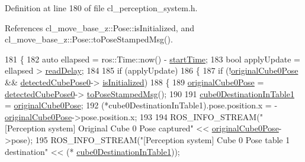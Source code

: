 Definition at line 180 of file cl\+\_\+perception\+\_\+system.\+h.



References cl\+\_\+move\+\_\+base\+\_\+z\+::\+Pose\+::is\+Initialized, and cl\+\_\+move\+\_\+base\+\_\+z\+::\+Pose\+::to\+Pose\+Stamped\+Msg().


\begin{DoxyCode}
181   \{
182     \textcolor{keyword}{auto} ellapsed = ros::Time::now() - \hyperlink{classsm__moveit__3_1_1cl__perception__system_1_1ClPerceptionSystem_adbc00ec0624260b9a927cf927fb1f549}{startTime};
183     \textcolor{keywordtype}{bool} applyUpdate = ellapsed > \hyperlink{classsm__moveit__3_1_1cl__perception__system_1_1ClPerceptionSystem_ad8826a690d57933b8adbe9011679f600}{readDelay};
184 
185     \textcolor{keywordflow}{if} (applyUpdate)
186     \{
187       \textcolor{keywordflow}{if} (!\hyperlink{classsm__moveit__3_1_1cl__perception__system_1_1ClPerceptionSystem_a296e8dd41bbb35a95d64e1780ab8be3d}{originalCube0Pose} && \hyperlink{classsm__moveit__3_1_1cl__perception__system_1_1ClPerceptionSystem_a6ac235df679beb12a5b5213bff957440}{detectedCubePose0}->
      \hyperlink{classcl__move__base__z_1_1Pose_a49df3a978021edb71a48ef5e6d8e75a8}{isInitialized})
188       \{
189         \hyperlink{classsm__moveit__3_1_1cl__perception__system_1_1ClPerceptionSystem_a296e8dd41bbb35a95d64e1780ab8be3d}{originalCube0Pose} = \hyperlink{classsm__moveit__3_1_1cl__perception__system_1_1ClPerceptionSystem_a6ac235df679beb12a5b5213bff957440}{detectedCubePose0}->
      \hyperlink{classcl__move__base__z_1_1Pose_a63887a88c1ac6e9a4a71b8d7d11aed6c}{toPoseStampedMsg}();
190 
191         \hyperlink{classsm__moveit__3_1_1cl__perception__system_1_1ClPerceptionSystem_a56f5be6a474c2825b99cab724d2099a1}{cube0DestinationInTable1} = \hyperlink{classsm__moveit__3_1_1cl__perception__system_1_1ClPerceptionSystem_a296e8dd41bbb35a95d64e1780ab8be3d}{originalCube0Pose};
192         (*cube0DestinationInTable1).pose.position.x = -\hyperlink{classsm__moveit__3_1_1cl__perception__system_1_1ClPerceptionSystem_a296e8dd41bbb35a95d64e1780ab8be3d}{originalCube0Pose}->pose.position.x;
193 
194         ROS\_INFO\_STREAM(\textcolor{stringliteral}{"[Perception system] Original Cube 0 Pose captured"} << 
      \hyperlink{classsm__moveit__3_1_1cl__perception__system_1_1ClPerceptionSystem_a296e8dd41bbb35a95d64e1780ab8be3d}{originalCube0Pose}->pose);
195         ROS\_INFO\_STREAM(\textcolor{stringliteral}{"[Perception system] Cube 0 Pose table 1 destination"} << (*
      \hyperlink{classsm__moveit__3_1_1cl__perception__system_1_1ClPerceptionSystem_a56f5be6a474c2825b99cab724d2099a1}{cube0DestinationInTable1}));

\end{DoxyCode}
